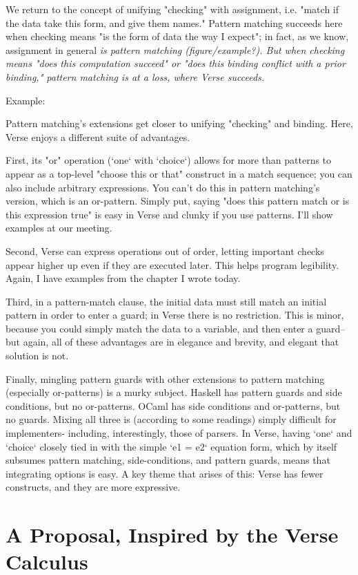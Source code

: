 \documentclass[manuscript,screen,review, 12pt]{acmart}
\begin{document}
We return to the concept of unifying "checking" with assignment, i.e. "match if
the data take this form, and give them names." Pattern matching succeeds here
when checking means "is the form of data the way I expect"; in fact, as we know,
assignment in general \it{is} pattern matching (figure/example?). But when
checking means "does this computation succeed" or "does this binding conflict
with a prior binding," pattern matching is at a loss, where Verse succeeds. 

Example: 


Pattern matching's extensions get closer to unifying "checking" and binding.
Here, Verse enjoys a different suite of advantages. 

First, its "or" operation (`one` with `choice`) allows for more than patterns to
appear as a top-level "choose this or that" construct in a match sequence; you
can also include arbitrary expressions. You can't do this in pattern matching's
version, which is an or-pattern. Simply put, saying "does this pattern match or
is this expression true" is easy in Verse and clunky if you use patterns. I'll
show examples at our meeting. 

Second, Verse can express operations out of order, letting important checks
appear higher up even if they are executed later. This helps program legibility.
Again, I have examples from the chapter I wrote today. 

Third, in a pattern-match clause, the initial data must still match an initial
pattern in order to enter a guard; in Verse there is no restriction. This is
minor, because you could simply match the data to a variable, and then enter a
guard-- but again, all of these advantages are in elegance and brevity, and
elegant that solution is not. 

Finally, mingling pattern guards with other extensions to pattern matching
(especially or-patterns) is a murky subject. Haskell has pattern guards and side
conditions, but no or-patterns. OCaml has side conditions and or-patterns, but
no guards. Mixing all three is (according to some readings) simply difficult for
implementers- including, interestingly, those of parsers. In Verse, having `one`
and `choice` closely tied in with the simple `e1 = e2` equation form, which by
itself subsumes pattern matching, side-conditions, and pattern guards, means
that integrating options is easy. A key theme that arises of this: Verse has
fewer constructs, and they are more expressive.  

\section{A Proposal, Inspired by the Verse Calculus}
\end{document}
